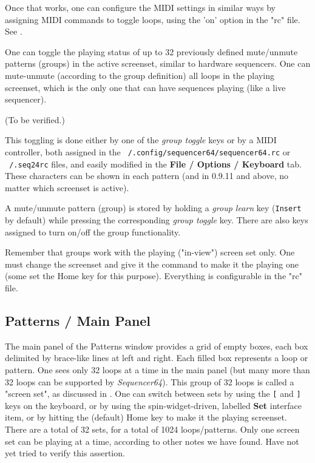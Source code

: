    Once that works, one can configure the MIDI settings in similar ways
   by assigning MIDI commands to toggle loops, using 
   the 'on' option in the "rc" file.
   See .

	One can toggle the playing status of up to 32 previously
	defined mute/unmute patterns (groups) in the active screenset,
   similar to hardware sequencers.
   One can mute-unmute (according to the group definition) all loops in the
   playing screenset, which is the only one that can have sequences playing
   (like a live sequencer).
   
   (To be verified.)

	This toggling is done either by one of the \textsl{group toggle} keys
	or by a MIDI controller, both assigned in the
   \texttt{~/.config/sequencer64/sequencer64.rc} or \texttt{~/.seq24rc} files,
   and easily modified in the \textbf{File / Options / Keyboard} tab.
   These characters can be shown in each pattern (and in 0.9.11 and above, no
   matter which screenset is active).

	A mute/unmute pattern (group) is stored by holding a
   \textsl{group learn} key (\texttt{Insert} by default) while pressing the
   corresponding \textsl{group toggle} key.
	There are also keys assigned to turn on/off the group functionality.

   Remember that groups work with the playing ("in-view") screen set only.
   One must change the screenset and give it the command to make it the
   playing one
   (some set the Home key for this purpose).
   Everything is configurable in the "rc" file.

\subsection{Patterns / Main Panel}
\label{subsec:seq64_patterns_panel_main}

   The main panel of the Patterns window provides a grid of empty boxes,
   each box delimited by brace-like lines at left and right.
   Each filled box represents a loop or pattern.
   One sees only 32 loops at a time in the main panel (but many more than
   32 loops can be supported by \textsl{Sequencer64}).
   This group of 32 loops is called a "screen set", as discussed in
   .
   One can switch between sets by using the
   \index{keys![}
   \texttt{[} and
   \index{keys!]}
   \texttt{]} keys on the keyboard, or by using
   the spin-widget-driven, labelled \textbf{Set} interface item, or
   by hitting the (default) Home key to make it the playing screenset.
   There are a total of 32 sets, for a total of 1024 loops/patterns. 
   Only one screen set can be playing at a time, according to other notes we
   have found.  Have not yet tried to verify this assertion.

